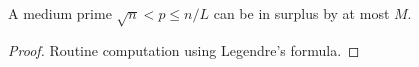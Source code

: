 \begin{sublemma}
\label{initial-factorization-medium-prime-le}
\leanok
A medium prime $\sqrt{n} < p ≤ n/L$ can be in surplus by at most $M$.
\end{sublemma}
\begin{proof}
\leanok
Routine computation using Legendre's formula.
\end{proof}
